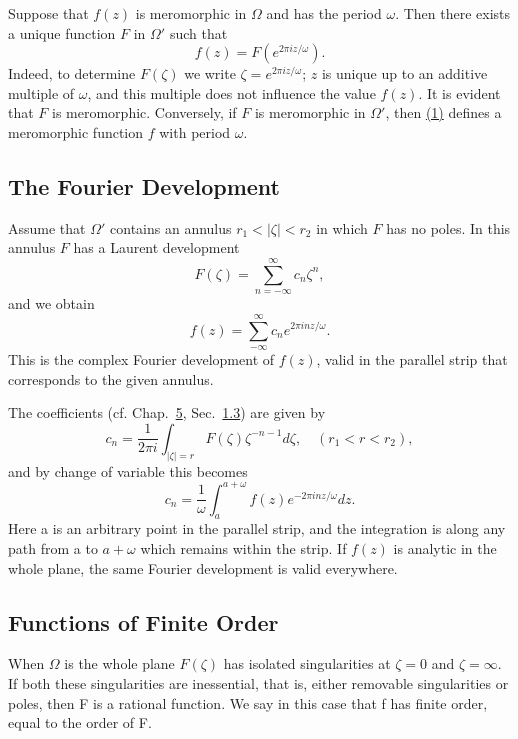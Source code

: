 Suppose that $f(z)$ is meromorphic in $\Omega$ and has the period $\omega$. Then there exists a unique function $F$ in $\Omega'$ such that
\begin{equation*}
f (z) = F \left(e ^ {2 \pi i z / \omega}\right).\tag{1}\label{eq:7.1}
\end{equation*}
Indeed, to determine $F(\zeta)$ we write $\zeta = e^{2\pi iz / \omega}$; $z$ is unique up to an additive multiple of $\omega$, and this multiple does not influence the value $f(z)$. It is evident that $F$ is meromorphic. Conversely, if $F$ is meromorphic in $\Omega'$, then \hyperref[eq:7.1]{(1)} defines a meromorphic function $f$ with period $\omega$.

\setcounter{section}{1}\setcounter{subsection}{1}\subsection{The Fourier Development}\label{sec:7.1.2}
Assume that $\Omega'$ contains an annulus $r_1 < |\zeta| < r_2$ in which $F$ has no poles. In this annulus $F$ has a Laurent development
\begin{equation*}
F (\zeta) = \sum_ {n = - \infty} ^ {\infty} c _ {n} \zeta^ {n},
\end{equation*}
and we obtain
\begin{equation*}
f (z) = \sum_ {- \infty} ^ {\infty} c _ {n} e ^ {2 \pi i n z / \omega}.
\end{equation*}
This is the complex Fourier development of $f(z)$, valid in the parallel strip that corresponds to the given annulus.

The coefficients (cf. Chap.~\hyperref[chap:5]{5}, Sec.~\hyperref[sec:5.1.3]{1.3}) are given by
\begin{equation*}
c _ {n} = \frac {1}{2 \pi i} \int_ {| \zeta | = r} F (\zeta) \zeta^ {- n - 1} d \zeta , \quad (r _ {1} <   r <   r _ {2}),
\end{equation*}
and by change of variable this becomes
\begin{equation*}
c _ {n} = \frac {1}{\omega} \int_ {a} ^ {a + \omega} f (z) e ^ {- 2 \pi i n z / \omega} d z.
\end{equation*}
Here a is an arbitrary point in the parallel strip, and the integration is along any path from a to $a + \omega$ which remains within the strip. If $f(z)$ is analytic in the whole plane, the same Fourier development is valid everywhere.

\setcounter{section}{1}\setcounter{subsection}{2}\subsection{Functions of Finite Order}\label{sec:7.1.3}
When $\Omega$ is the whole plane $F(\zeta)$ has isolated singularities at $\zeta = 0$ and $\zeta = \infty$. If both these singularities are inessential, that is, either removable singularities or poles, then F is a rational function. We say in this case that f has finite order, equal to the order of F.

